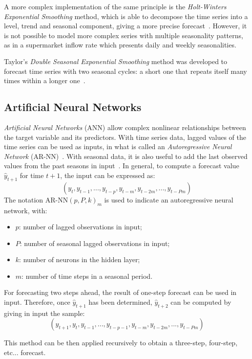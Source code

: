 A more complex implementation of the same principle is the \emph{Holt-Winters Exponential Smoothing} method, which is able to decompose the time series into a level, trend and seasonal component, giving a more precise forecast~\cite{holt,winters}. However, it is not possible to model more complex series with multiple seasonality patterns, as in a supermarket inflow rate which presents daily and weekly seasonalities.

Taylor’s \emph{Double Seasonal Exponential Smoothing} method was developed to forecast time series with two seasonal cycles: a short one that repeats itself many times within a longer one~\cite{taylor}.

\subsection{Artificial Neural Networks}
\label{subsec:artificial_neural_networks}

\emph{Artificial Neural Networks} (ANN) allow complex nonlinear relationships between the target variable and its predictors. With time series data, lagged values of the time series can be used as inputs, in what is called an \emph{Autoregressive Neural Network} (AR-NN)~\cite{tang}. With seasonal data, it is also useful to add the last observed values from the past seasons in input~\cite{hyndman2018}. In general, to compute a forecast value \( \hat{y}_{t+1} \) for time \( t+1 \), the input can be expressed as:
\[
  (y_{t}, y_{t-1}, ..., y_{t-p}, y_{t-m}, y_{t-2m}, ..., y_{t-Pm})
\]
The notation \( \text{AR-NN}(p, P, k)_m \) is used to indicate an autoregressive neural network, with:
\begin{itemize}
  \item \( p \): number of lagged observations in input;
  \item \( P \): number of seasonal lagged observations in input;
  \item \( k \): number of neurons in the hidden layer;
  \item \( m \): number of time steps in a seasonal period.
\end{itemize}

For forecasting two steps ahead, the result of one-step forecast can be used in input. Therefore, once \( \hat{y}_{t+1} \) has been determined, \( \hat{y}_{t+2} \) can be computed by giving in input the sample:
\[ (\hat{y}_{t+1}, y_{t}, y_{t-1}, ..., y_{t-p-1}, y_{t-m}, y_{t-2m}, ..., y_{t-Pm}) \]

This method can be then applied recursively to obtain a three-step, four-step, etc... forecast.


